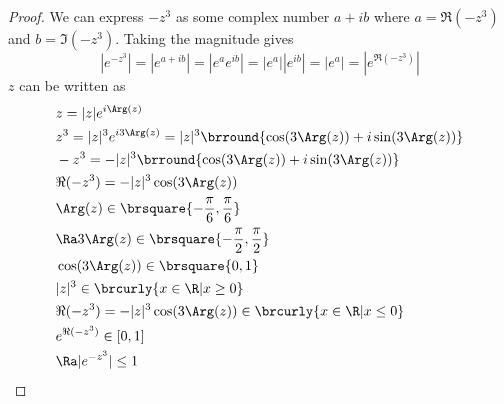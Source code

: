 \begin{proof}
We can express $-z^3$ as some complex number $a+ib$ where $a=\Re(-z^3)$ and $b=\Im(-z^3)$. Taking the magnitude gives
\[ |e^{-z^3}|=|e^{a+ib}|=|e^ae^{ib}|=|e^a||e^{ib}|=|e^a|=|e^{\Re(-z^3)}| \]
$z$ can be written as
\begin{align*}
    &z=|z|e^{i\Arg(z)}\\
    &z^3=|z|^3e^{i3\Arg(z)}=|z|^3\brround{\cos(3\Arg(z))+i\sin(3\Arg(z))}\\
    &-z^3=-|z|^3\brround{\cos(3\Arg(z))+i\sin(3\Arg(z))}\\
    &\Re(-z^3)=-|z|^3\cos(3\Arg(z))\\
    &\Arg(z)\in\brsquare{-\frac{\pi}{6},\frac{\pi}{6}}\\
    &\Ra 3\Arg(z)\in\brsquare{-\frac{\pi}{2},\frac{\pi}{2}}\\
    &\cos(3\Arg(z))\in\brsquare{0,1}\\
    &|z|^3\in\brcurly{x\in\R|x\geq0}\\
    &\Re(-z^3)=-|z|^3\cos(3\Arg(z))\in\brcurly{x\in\R|x\leq0}\\
    &e^{\Re(-z^3)}\in[0,1]\\
    &\Ra |e^{-z^3}|\leq1
\end{align*}
\end{proof}

